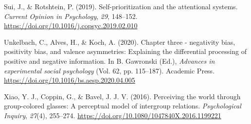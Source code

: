 \documentclass[
  man]{apa6}
\newlength{\cslhangindent}
\newlength{\cslentryspacingunit} %
\newenvironment{CSLReferences}[2] %
 {%
  \setlength{\parindent}{0pt}
  \ifodd #1
  \let\oldpar\par
  \def\par{\hangindent=\cslhangindent\oldpar}
  \fi
  \setlength{\parskip}{#2\cslentryspacingunit}
 }%
 {}
\begin{document}
\begin{CSLReferences}{1}{0}
\leavevmode{}%
Sui, J., \& Rotshtein, P. (2019). Self-prioritization and the attentional systems. \emph{Current Opinion in Psychology}, \emph{29}, 148--152. \url{https://doi.org/10.1016/j.copsyc.2019.02.010}

\leavevmode{}%
Unkelbach, C., Alves, H., \& Koch, A. (2020). Chapter three - negativity bias, positivity bias, and valence asymmetries: Explaining the differential processing of positive and negative information. In B. Gawronski (Ed.), \emph{Advances in experimental social psychology} (Vol. 62, pp. 115--187). Academic Press. \url{https://doi.org/10.1016/bs.aesp.2020.04.005}

\leavevmode{}%
Xiao, Y. J., Coppin, G., \& Bavel, J. J. V. (2016). Perceiving the world through group-colored glasses: A perceptual model of intergroup relations. \emph{Psychological Inquiry}, \emph{27}(4), 255--274. \url{https://doi.org/10.1080/1047840X.2016.1199221}

\end{CSLReferences}

\endgroup
\end{document}
